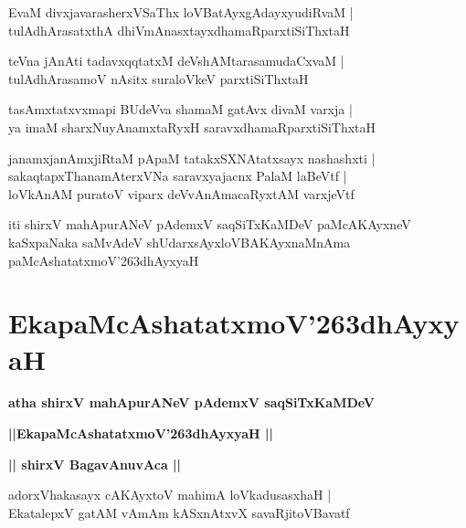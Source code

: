 \documentclass[twoside,12pt,openright]{book}
\def\S{\char'263}
\newcounter{shloka}[chapter]
\def\uvaca#1{\centerline{{\large\textbf{#1}}}}
\begin{document}
\begin{shloka}%
EvaM divxjavarasherxVSaThx loVBatAyxgAdayxyudiRvaM |\\
tulAdhArasatxthA dhiVmAnasxtayxdhamaRparxtiSiThxtaH 
\end{shloka}

\begin{shloka}%
teVna jAnAti tadavxqqtatxM deVshAMtarasamudaCxvaM |\\
tulAdhArasamoV nAsitx suraloVkeV parxtiSiThxtaH 
\end{shloka}

\begin{shloka}%
tasAmxtatxvxmapi BUdeVva shamaM gatAvx divaM varxja |\\
ya imaM sharxNuyAnamxtaRyxH saravxdhamaRparxtiSiThxtaH 
\end{shloka}

\begin{shloka}%
janamxjanAmxjiRtaM pApaM tatakxSXNAtatxsayx nashashxti |\\
sakaqtapxThanamAterxVNa saravxyajacnx PalaM laBeVtf |\\
loVkAnAM puratoV viparx deVvAnAmacaRyxtAM varxjeVtf
\end{shloka}

\begin{center}
iti shirxV mahApurANeV pAdemxV saqSiTxKaMDeV paMcAKAyxneV kaSxpaNaka  saMvAdeV 
shUdarxsAyxloVBAKAyxnaMnAma paMcAshatatxmoV\S dhAyxyaH 
\end{center}

\chapter{EkapaMcAshatatxmoV\S dhAyxyaH}

\begin{center}
{\LARGE\bfseries atha shirxV mahApurANeV pAdemxV saqSiTxKaMDeV}
\end{center}

\begin{center}
{\LARGE\bfseries ||EkapaMcAshatatxmoV\S dhAyxyaH || }
\end{center}

\uvaca{|| shirxV BagavAnuvAca ||}

\begin{shloka}%
adorxVhakasayx cAKAyxtoV mahimA loVkadusasxhaH |\\
EkatalepxV gatAM vAmAm kASxnAtxvX savaRjitoVBavatf 
\end{shloka}
\end{document}
